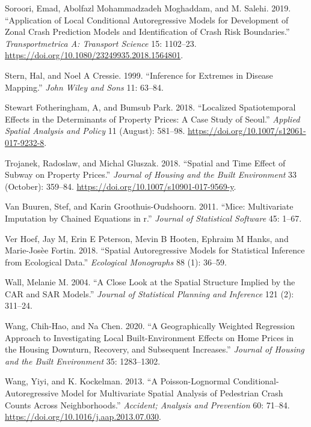 \documentclass[
  default,
]{sn-jnl}
\newlength{\cslhangindent}
\newenvironment{CSLReferences}[2] %
 {\begin{list}{}{%
  \setlength{\itemindent}{0pt}
  \setlength{\leftmargin}{0pt}
  \setlength{\parsep}{0pt}
  \ifodd #1
   \setlength{\leftmargin}{\cslhangindent}
   \setlength{\itemindent}{-1\cslhangindent}
  \fi
  \setlength{\itemsep}{#2\baselineskip}}}
 {\end{list}}
\begin{document}
\begin{CSLReferences}{1}{0}
Soroori, Emad, Abolfazl Mohammadzadeh Moghaddam, and M. Salehi. 2019.
{``Application of Local Conditional Autoregressive Models for
Development of Zonal Crash Prediction Models and Identification of Crash
Risk Boundaries.''} \emph{Transportmetrica A: Transport Science} 15:
1102--23. \url{https://doi.org/10.1080/23249935.2018.1564801}.

Stern, Hal, and Noel A Cressie. 1999. {``Inference for Extremes in
Disease Mapping.''} \emph{John Wiley and Sons} 11: 63--84.

Stewart Fotheringham, A, and Bumsub Park. 2018. {``Localized
Spatiotemporal Effects in the Determinants of Property Prices: A Case
Study of Seoul.''} \emph{Applied Spatial Analysis and Policy} 11
(August): 581--98. \url{https://doi.org/10.1007/s12061-017-9232-8}.

Trojanek, Radoslaw, and Michal Gluszak. 2018. {``Spatial and Time Effect
of Subway on Property Prices.''} \emph{Journal of Housing and the Built
Environment} 33 (October): 359--84.
\url{https://doi.org/10.1007/s10901-017-9569-y}.

Van Buuren, Stef, and Karin Groothuis-Oudshoorn. 2011. {``Mice:
Multivariate Imputation by Chained Equations in r.''} \emph{Journal of
Statistical Software} 45: 1--67.

Ver Hoef, Jay M, Erin E Peterson, Mevin B Hooten, Ephraim M Hanks, and
Marie-Josèe Fortin. 2018. {``Spatial Autoregressive Models for
Statistical Inference from Ecological Data.''} \emph{Ecological
Monographs} 88 (1): 36--59.

Wall, Melanie M. 2004. {``A Close Look at the Spatial Structure Implied
by the CAR and SAR Models.''} \emph{Journal of Statistical Planning and
Inference} 121 (2): 311--24.

Wang, Chih-Hao, and Na Chen. 2020. {``A Geographically Weighted
Regression Approach to Investigating Local Built-Environment Effects on
Home Prices in the Housing Downturn, Recovery, and Subsequent
Increases.''} \emph{Journal of Housing and the Built Environment} 35:
1283--1302.

Wang, Yiyi, and K. Kockelman. 2013. {``A Poisson-Lognormal
Conditional-Autoregressive Model for Multivariate Spatial Analysis of
Pedestrian Crash Counts Across Neighborhoods.''} \emph{Accident;
Analysis and Prevention} 60: 71--84.
\url{https://doi.org/10.1016/j.aap.2013.07.030}.


\end{CSLReferences}
\end{document}
